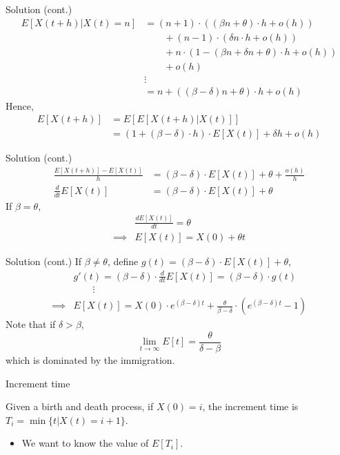 \documentclass[mathserif]{beamer}
\begin{document}
\begin{frame}{Solution (cont.)}
\begin{align*}
E[X(t+h)|X(t) = n] & = (n+1)\cdot ((\beta n + \theta)\cdot h + o(h)) \\
& \qquad + (n-1)\cdot (\delta n\cdot h + o(h)) \\
& \qquad + n\cdot (1-(\beta n + \delta n + \theta)\cdot h + o(h)) \\
& \qquad + o(h) \\
& \vdots \\
& = n + ((\beta - \delta)n + \theta)\cdot h + o(h)
\end{align*}
Hence,
\begin{align*}
E[X(t+h)] & = E[E[X(t+h)|X(t)]] \\
& = (1+(\beta - \delta)\cdot h)\cdot E[X(t)] + \delta h + o(h)
\end{align*}
\end{frame}

\begin{frame}{Solution (cont.)}
\begin{align*}
\frac{E[X(t+h)]-E[X(t)]}{h} & = (\beta-\delta)\cdot E[X(t)] + \theta + \frac{o(h)}{h} \\
\frac{d}{dt}E[X(t)] & = (\beta-\delta)\cdot E[X(t)] + \theta
\end{align*}
If $\beta = \theta$,
\begin{align*}
& \frac{d E[X(t)]}{dt} = \theta \\
\implies & E[X(t)] = X(0) + \theta t
\end{align*}
\end{frame}

\begin{frame}{Solution (cont.)}
If $\beta \neq \theta$, define $g(t) = (\beta-\delta)\cdot E[X(t)] + \theta$,
\begin{align*}
& g'(t) = (\beta - \delta)\cdot \frac{d}{dt}E[X(t)] = (\beta - \delta)\cdot g(t) \\
& \qquad\vdots \\
\implies & E[X(t)] = X(0)\cdot e^{(\beta - \delta) t} + \frac{\theta}{\beta - \delta}\cdot (e^{(\beta - \delta) t} - 1)
\end{align*}
Note that if $\delta > \beta$,
\[
\lim_{t\to\infty} E[t] = \frac{\theta}{\delta - \beta}
\]
which is dominated by the immigration.
\end{frame}

\begin{frame}{Increment time}
\begin{definition}
Given a birth and death process, if $X(0)=i$, the increment time is $T_i = \min\{t | X(t) = i+1\}$.
\end{definition}
\begin{itemize}
\item We want to know the value of $E[T_i]$.
\end{itemize}
\end{frame}
\end{document}
